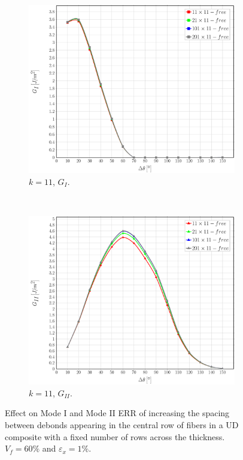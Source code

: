 \documentclass[review]{elsarticle}
\begin{document}
\begin{figure}[!h]
    \begin{subfigure}[b]{0.475\textwidth}
        \includegraphics[width=\textwidth]{sideabovefibers-t11-vf60-GI.pdf}
        \caption{$k=11$, $G_{I}$.}\label{subfig:sideabovefiber60MIt11}
    \end{subfigure} ~
    \begin{subfigure}[b]{0.475\textwidth}
        \includegraphics[width=\textwidth]{sideabovefibers-t11-vf60-GII.pdf}
        \caption{$k=11$, $G_{II}$.}\label{subfig:sideabovefiber60MIIt11}
    \end{subfigure}

\caption{Effect on Mode I and Mode II ERR of increasing the spacing between debonds appearing in the central row of fibers in a UD composite with a fixed number of rows across the thickness. $V_{f}=60\%$ and $\varepsilon_{x}=1\%$.}\label{fig:sideabovefibersthickfixed}
\end{figure}
\end{document}
